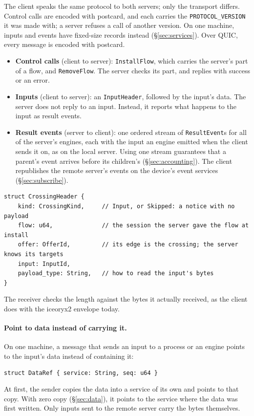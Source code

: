 \documentclass[11pt]{article}
\newcommand{\code}[1]{\texttt{#1}}
\begin{document}
The client speaks the same protocol to both servers; only the transport
differs. Control calls are encoded with postcard, and each carries the
\code{PROTOCOL\_VERSION} it was made with; a server refuses a call of another
version. On one machine, inputs and events have fixed-size records instead
(\S\ref{sec:services}). Over QUIC, every message is encoded with
postcard.
\begin{itemize}[nosep]
  \item \textbf{Control calls} (client to server): \code{InstallFlow}, which
        carries the server's part of a flow, and \code{RemoveFlow}. The server
        checks its part, and replies with success or an error.
  \item \textbf{Inputs} (client to server): an \code{InputHeader}, followed
        by the input's data. The server does not reply to an input. Instead,
        it reports what happens to the input as result events.
  \item \textbf{Result events} (server to client): one ordered stream of
        \code{ResultEvent}s for all of the server's engines, each with the
        input an engine emitted when the client sends it on, as on the local
        server. Using one stream
        guarantees that a parent's event arrives before its children's
        (\S\ref{sec:accounting}). The client republishes the remote server's
        events on the device's event services (\S\ref{sec:subscribe}).
\end{itemize}
\begin{lstlisting}
struct CrossingHeader {
    kind: CrossingKind,     // Input, or Skipped: a notice with no payload
    flow: u64,              // the session the server gave the flow at install
    offer: OfferId,         // its edge is the crossing; the server knows its targets
    input: InputId,
    payload_type: String,   // how to read the input's bytes
}
\end{lstlisting}
The receiver checks the length against the bytes it actually received, as the
client does with the iceoryx2 envelope today.

\paragraph{Point to data instead of carrying it.} On one machine, a message
that sends an input to a process or an engine points to the input's data
instead of containing it:
\begin{lstlisting}
struct DataRef { service: String, seq: u64 }
\end{lstlisting}
At first, the sender copies the data into a service of its own and points to
that copy. With zero copy (\S\ref{sec:data}), it points to the service where
the data was first written. Only inputs sent to the remote server carry the
bytes themselves.
\end{document}
